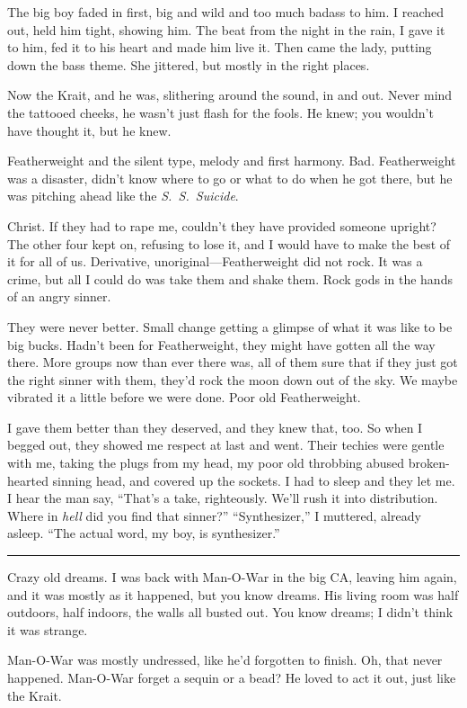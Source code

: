 The big boy faded in first, big and wild and too much badass to him. I reached out, held him tight, showing him. The beat from the night in the rain, I gave it to him, fed it to his heart and made him live it. Then came the lady, putting down the bass theme. She jittered, but mostly in the right places.

Now the Krait, and he was, slithering around the sound, in and out. Never mind the tattooed cheeks, he wasn't just flash for the fools. He knew; you wouldn't have thought it, but he knew.

Featherweight and the silent type, melody and first harmony. Bad. Featherweight was a disaster, didn't know where to go or what to do when he got there, but he was pitching ahead like the \textit{S.\ S.\ Suicide}.

Christ. If they had to rape me, couldn't they have provided someone upright? The other four kept on, refusing to lose it, and I would have to make the best of it for all of us. Derivative, unoriginal—Featherweight did not rock. It was a crime, but all I could do was take them and shake them. Rock gods in the hands of an angry sinner.

They were never better. Small change getting a glimpse of what it was like to be big bucks. Hadn't been for Featherweight, they might have gotten all the way there. More groups now than ever there was, all of them sure that if they just got the right sinner with them, they'd rock the moon down out of the sky.
We maybe vibrated it a little before we were done. Poor old Featherweight.

I gave them better than they deserved, and they knew that, too. So when I begged out, they showed me respect at last and went. Their techies were gentle with me, taking the plugs from my head, my poor old throbbing abused broken-hearted sinning head, and covered up the sockets. I had to sleep and they let me. I hear the man say, ``That's a take, righteously. We'll rush it into distribution. Where in \textit{hell} did you find that sinner?''
``Synthesizer,'' I muttered, already asleep. ``The actual word, my boy, is synthesizer.''

\fancybreak{* * *}

Crazy old dreams. I was back with Man-O-War in the big CA, leaving him again, and it was mostly as it happened, but you know dreams. His living room was half outdoors, half indoors, the walls all busted out. You know dreams; I didn't think it was strange.

Man-O-War was mostly undressed, like he'd forgotten to finish. Oh, that never happened. Man-O-War forget a sequin or a bead? He loved to act it out, just like the Krait.

